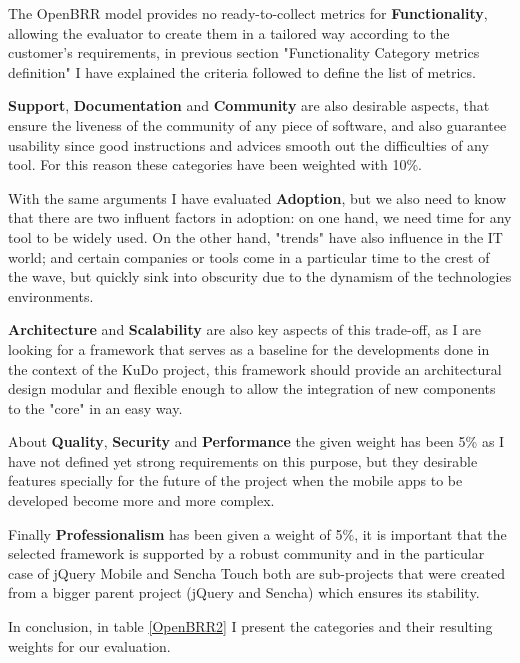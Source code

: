 \documentclass[a4paper,12pt]{book}
\begin{document}
The OpenBRR model provides no ready-to-collect metrics for \textbf{Functionality}, allowing the evaluator to create them in a tailored way according to the customer's requirements, in previous section "Functionality Category metrics definition" I have explained the criteria followed to define the list of metrics.

\textbf{Support}, \textbf{Documentation} and \textbf{Community} are also desirable aspects, that ensure the liveness of the community of any piece of software, and also guarantee usability since good instructions and advices smooth out the
difficulties of any tool. For this reason these categories have been
weighted with 10\%. 

With the same arguments I have evaluated \textbf{Adoption}, but we also need to know that there are two influent factors in adoption: on one hand, we need time for any tool to be widely used. On the other hand, "trends" have also influence in the IT world; and certain
companies or tools come in a particular time to the crest of the wave, but quickly sink into obscurity due to the dynamism of the technologies environments. 

\textbf{Architecture}  and \textbf{Scalability} are also key aspects of this trade-off, as I are looking for a framework that serves as a baseline for the developments done in the context of the KuDo project, this framework should provide an architectural design modular and flexible enough to allow the integration of new components to the "core" in an easy way.

About \textbf{Quality}, \textbf{Security} and \textbf{Performance} the given weight has been 5\% as I have not defined yet strong requirements on this purpose, but they desirable features specially for the future of the project when the mobile apps to be developed become more and more complex.

Finally \textbf{Professionalism} has been given a weight of 5\%, it is important that the selected framework is supported by a robust community and in the particular case of jQuery Mobile and Sencha Touch both are sub-projects that were created from a bigger parent project (jQuery and Sencha) which ensures its stability. 

In conclusion, in table \ref{OpenBRR2} I present the categories and
their resulting weights for our evaluation.
\end{document}
